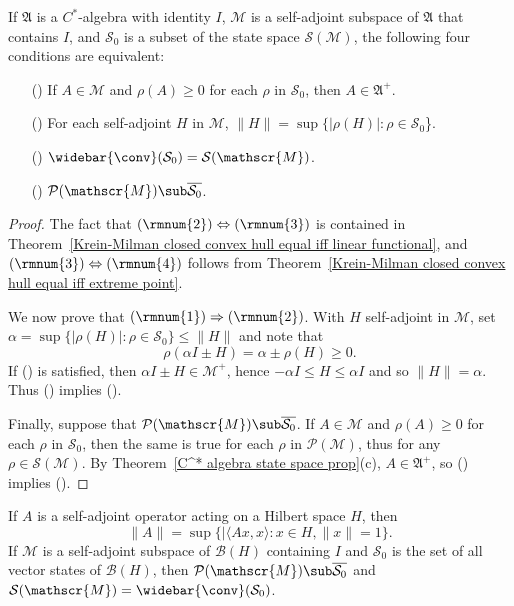 \begin{theorem}\label{C^* algebra state subspace generating iff}
If $\mathfrak{A}$ is a $C^*$-algebra with identity $I$, $\mathscr{M}$ is a self-adjoint subspace of $\mathfrak{A}$ that contains $I$, and $\mathcal{S}_0$ is a subset of the state space $\mathcal{S}(\mathscr{M})$, the following four conditions are equivalent:
\begin{itemize}
\item[(\rmnum{1})] If $A\in\mathscr{M}$ and $\rho(A)\geq 0$ for each $\rho$ in $\mathcal{S}_0$, then $A\in\mathfrak{A}^+$.
\item[(\rmnum{2})] For each self-adjoint $H$ in $\mathscr{M}$, $\|H\|=\sup\{|\rho(H)|:\rho\in\mathcal{S}_0$\}.
\item[(\rmnum{3})] $\widebar{\conv}(\mathcal{S}_0)=\mathcal{S}(\mathscr{M})$.
\item[(\rmnum{4})] $\mathcal{P}(\mathscr{M})\sub\overline{\mathcal{S}_0}$.
\end{itemize}
\end{theorem}
\begin{proof}
The fact that $(\rmnum{2})\Leftrightarrow(\rmnum{3})$ is contained in Theorem~\ref{Krein-Milman closed convex hull equal iff linear functional}, and $(\rmnum{3})\Leftrightarrow(\rmnum{4})$ follows from Theorem~\ref{Krein-Milman closed convex hull equal iff extreme point}.\par
We now prove that $(\rmnum{1})\Rightarrow(\rmnum{2})$. With $H$ self-adjoint in $\mathscr{M}$, set $\alpha=\sup\{|\rho(H)|:\rho\in\mathcal{S}_0\}\leq\|H\|$ and note that
\[\rho(\alpha I\pm H)=\alpha\pm\rho(H)\geq 0.\]
If () is satisfied, then $\alpha I\pm H\in\mathscr{M}^+$, hence $-\alpha I\leq H\leq\alpha I$ and so $\|H\|=\alpha$. Thus () implies ().\par
Finally, suppose that $\mathcal{P}(\mathscr{M})\sub\overline{\mathcal{S}_0}$. If $A\in\mathscr{M}$ and $\rho(A)\geq 0$ for each $\rho$ in $\mathcal{S}_0$, then the same is true for each $\rho$ in $\mathcal{P}(\mathscr{M})$, thus for any $\rho\in\mathcal{S}(\mathscr{M})$. By Theorem~\ref{C^* algebra state space prop}(c), $A\in\mathfrak{A}^+$, so () implies ().
\end{proof}
\begin{corollary}
If $A$ is a self-adjoint operator acting on a Hilbert space $H$, then
\[\|A\|=\sup\{|\langle Ax,x\rangle:x\in H,\|x\|=1\}.\]
If $\mathscr{M}$ is a self-adjoint subspace of $\mathcal{B}(H)$ containing $I$ and $\mathcal{S}_0$ is the set of all vector states of $\mathcal{B}(H)$, then $\mathcal{P}(\mathscr{M})\sub\overline{\mathcal{S}_0}$ and $\mathcal{S}(\mathscr{M})=\widebar{\conv}(\mathcal{S}_0)$.
\end{corollary}
